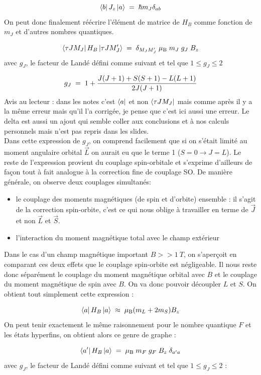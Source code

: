 \[
    \bra{b}J_z\ket{a} \; = \; \hbar m_J \delta_{ab}
\]
On peut donc finalement réécrire l'élément de matrice de $H_B$ comme fonction de $m_J$ et d'autres nombres quantiques.

\[
    \bra{\tau J M_J}H_B\ket{\tau J M'_J} \; = \; \delta_{M_J M'_J} \;\mu_\text{B} \; m_J \; g_J \; B_z
\]
avec $g_J$, le facteur de Landé défini comme suivant et tel que $1\leq g_J \leq 2$

\[
    g_J \; = \;  1 + \dfrac{J(J+1) + S(S+1) - L(L+1)}{2J(J+1)}
\]
Avis au lecteur : dans les notes c'est $\bra{a}$ et non $\bra{\tau J M_J}$ mais comme après il y a la même erreur mais qu'il l'a corrigée, je pense que c'est ici aussi une erreur. Le delta est aussi un ajout qui semble coller aux conclusions et à nos calculs personnels mais n'est pas repris dans les slides.\\

Dans cette expression de $g_J$, on comprend facilement que si on s'était limité au moment angulaire orbital $\vec{L}$ on aurait eu que le terme 1 ($S=0 \rightarrow J=L$). Le reste de l'expression provient du couplage spin-orbitale et s'exprime d'ailleurs de façon tout à fait analogue à la correction fine de couplage SO. De manière générale, on observe deux couplages simultanés:
\begin{itemize}[label=$\bullet$]
    \item le couplage des moments magnétiques (de spin et d'orbite) ensemble : il s'agit de la correction spin-orbite, c'est ce qui nous oblige à travailler en terme de $\vec{J}$ et non $\vec{L}$ et $\vec{S}$.
    \item l'interaction du moment magnétique total avec le champ extérieur
\end{itemize}
Dans le cas d'un champ magnétique important $B>>\SI{1}{T}$, on s'aperçoit en comparant ces deux effets que le couplage spin-orbite est négligeable. Il nous reste donc séparément le couplage du moment magnétique orbital avec $B$ et le couplage du moment magnétique de spin avec $B$. On va donc pouvoir découpler $L$ et $S$. On obtient tout simplement cette expression :

\[
    \bra{a}H_B\ket{a} \; \approx \; \mu_\text{B}(m_L + 2m_S)B_z
\]
On peut tenir exactement le même raisonnement pour le nombre quantique $F$ et les états hyperfins, on obtient alors ce genre de graphe :

\[
    \bra{a'}H_B\ket{a} \; = \; \mu_\text{B} \; m_F \; g_F \; B_z \;\delta_{a'a}
\]
avec $g_J$, le facteur de Landé défini comme suivant et tel que $1\leq g_J \leq 2$ :

